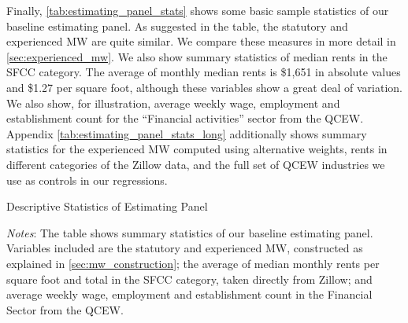 Finally, \autoref{tab:estimating_panel_stats} shows some basic sample statistics of our 
baseline estimating panel. As suggested in the table, the statutory and experienced MW 
are quite similar. We compare these measures in more detail in \autoref{sec:experienced_mw}.
We also show summary statistics of median rents in the SFCC category. The average of 
monthly median rents is \$1,651 in absolute values and \$1.27 per square foot, although 
these variables show a great deal of variation. We also show, for illustration, average 
weekly wage, employment and establishment count for the ``Financial activities'' sector 
from the QCEW. Appendix \autoref{tab:estimating_panel_stats_long} additionally shows 
summary statistics for the experienced MW computed using alternative weights, rents in 
different categories of the Zillow data, and the full set of QCEW industries we use as 
controls in our regressions.

\begin{table}[h!]
	\caption{Descriptive Statistics of Estimating Panel}
	\centering
	\label{tab:estimating_panel_stats}    
	
	\begin{minipage}{0.95\textwidth} \footnotesize
		\vspace{3mm} 
		\textit{Notes}: The table shows summary statistics of our baseline estimating panel.
		Variables included are the statutory and experienced MW, constructed as explained in
		\autoref{sec:mw_construction}; the average of median monthly rents per square foot 
		and total in the SFCC category, taken directly from Zillow; and average weekly wage, 
		employment and establishment count in the Financial Sector from the QCEW.
	\end{minipage}
\end{table}
